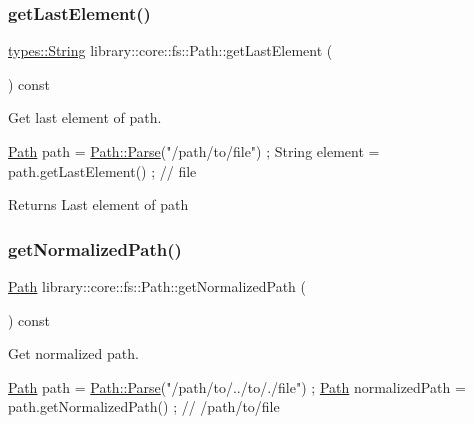 \subsubsection{\texorpdfstring{get\+Last\+Element()}{getLastElement()}}
{\footnotesize\ttfamily \hyperlink{classlibrary_1_1core_1_1types_1_1_string}{types\+::\+String} library\+::core\+::fs\+::\+Path\+::get\+Last\+Element (\begin{DoxyParamCaption}{ }\end{DoxyParamCaption}) const}



Get last element of path. 


\begin{DoxyCode}
\hyperlink{classlibrary_1_1core_1_1fs_1_1_path_aaba9a8e0153813f08f78f1c3275734a4}{Path} path = \hyperlink{classlibrary_1_1core_1_1fs_1_1_path_aebf5bd3af83e0b7376616e146f3e55df}{Path::Parse}(\textcolor{stringliteral}{"/path/to/file"}) ;
String element = path.getLastElement() ; \textcolor{comment}{// file}
\end{DoxyCode}


\begin{DoxyReturn}{Returns}
Last element of path 
\end{DoxyReturn}
\mbox{\label{classlibrary_1_1core_1_1fs_1_1_path_a920b1d062cb1274da811150afafba124}} 
\subsubsection{\texorpdfstring{get\+Normalized\+Path()}{getNormalizedPath()}}
{\footnotesize\ttfamily \hyperlink{classlibrary_1_1core_1_1fs_1_1_path}{Path} library\+::core\+::fs\+::\+Path\+::get\+Normalized\+Path (\begin{DoxyParamCaption}{ }\end{DoxyParamCaption}) const}



Get normalized path. 


\begin{DoxyCode}
\hyperlink{classlibrary_1_1core_1_1fs_1_1_path_aaba9a8e0153813f08f78f1c3275734a4}{Path} path = \hyperlink{classlibrary_1_1core_1_1fs_1_1_path_aebf5bd3af83e0b7376616e146f3e55df}{Path::Parse}(\textcolor{stringliteral}{"/path/to/../to/./file"}) ;
\hyperlink{classlibrary_1_1core_1_1fs_1_1_path_aaba9a8e0153813f08f78f1c3275734a4}{Path} normalizedPath = path.getNormalizedPath() ; \textcolor{comment}{// /path/to/file}
\end{DoxyCode}


